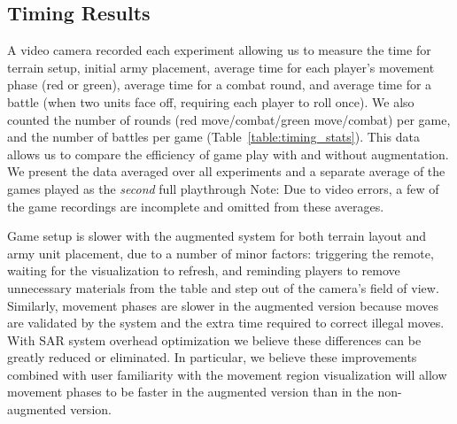 \vspace{-0.15in}
\subsection{Timing Results}


A video camera recorded each experiment
allowing us to measure the time for terrain setup, initial army
placement, average time for each player's movement phase (red or
green), average time for a combat round, and average time for a battle
(when two units face off, requiring each player to roll once).  We
also counted the number of rounds (red move/combat/green move/combat)
per game, and the number of battles per game
(Table~\ref{table:timing_stats}).  This data allows us to compare the
efficiency of game play with and without augmentation.  We present the
data averaged over all experiments and a separate average of the games
played as the {\em second} full playthrough
Note: Due to video errors,
a few of the game recordings are incomplete and 
omitted from these averages.

Game setup is slower with the augmented system for both terrain layout
and army unit placement,
due to a number of minor factors: triggering the remote, waiting for
the visualization to refresh, and reminding players to remove
unnecessary materials from the table and step out of the camera's
field of view.  Similarly, movement phases are slower in the augmented
version because moves are validated by the system and the extra time 
required to correct illegal moves.  With SAR system
overhead optimization we believe these differences can be greatly
reduced or eliminated.  In particular, we believe these improvements
combined with user familiarity with the movement region visualization
will allow movement phases to be faster in the augmented version than
in the non-augmented version.

